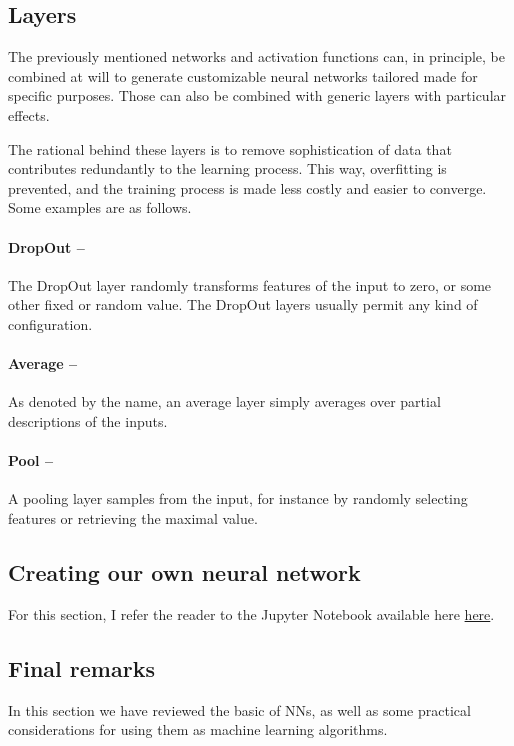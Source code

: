 \documentclass[]{report}
\begin{document}
\subsection{Layers}

The previously mentioned networks and activation functions can, in principle, be combined at will to generate customizable neural networks tailored made for specific purposes. Those can also be combined with generic layers with particular effects. 

The rational behind these layers is to remove sophistication of data that contributes redundantly to the learning process. This way, overfitting is prevented, and the training process  is made less costly and easier to converge. Some examples are as follows. 

\paragraph{DropOut --}
The DropOut layer randomly transforms features of the input to zero, or some other fixed or random value. The DropOut layers usually permit any kind of configuration. 


\paragraph{Average --} As denoted by the name, an average layer simply averages over partial descriptions of the inputs. 

\paragraph{Pool -- }A pooling layer samples from the input, for instance by randomly selecting features or retrieving the maximal value. 


\subsection{Creating our own neural network}

For this section, I refer the reader to the Jupyter Notebook available here \href{}{here}.

\subsection{Final remarks}

In this section we have reviewed the basic of NNs, as well as some practical considerations for using them as machine learning algorithms. 
\end{document}
